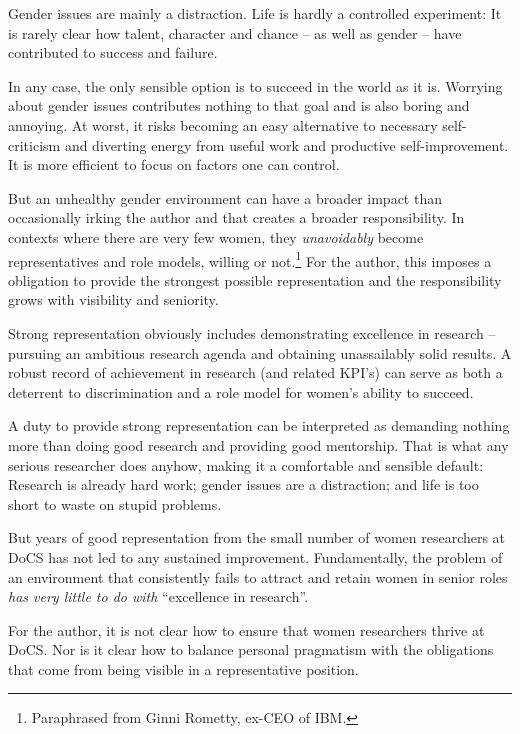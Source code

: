 \documentclass[a4paper,10pt,twocolumn]{article}
\begin{document}
Gender issues are mainly a distraction.  Life is hardly a controlled
experiment: It is rarely clear how talent, character and chance -- as
well as gender -- have contributed to success and failure.

In any case, the only sensible option is to succeed in the world as it
is.  Worrying about gender issues contributes nothing to that goal and
is also boring and annoying.  At worst, it risks becoming an easy
alternative to necessary self-criticism and diverting energy from
useful work and productive self-improvement.  It is more efficient to
focus on factors one can control.

But an unhealthy gender environment can have a broader impact than
occasionally irking the author and that creates a broader
responsibility.  In contexts where there are very few women, they
\emph{unavoidably} become representatives and role models, willing or
not.\footnote{Paraphrased from Ginni Rometty, ex-CEO of IBM.}  For the
author, this imposes a obligation to provide the strongest possible
representation and the responsibility grows with visibility and
seniority.

Strong representation obviously includes demonstrating excellence in
research -- pursuing an ambitious research agenda and obtaining
unassailably solid results.  A robust record of achievement in
research (and related KPI's) can serve as both a deterrent to
discrimination and a role model for women's ability to succeed.


A duty to provide strong representation can be interpreted as
demanding nothing more than doing good research and providing good
mentorship.  That is what any serious researcher does anyhow, making
it a comfortable and sensible default: Research is already hard work;
gender issues are a distraction; and life is too short to waste on
stupid problems.

But years of good representation from the small number of women
researchers at DoCS has not led to any sustained improvement.
Fundamentally, the problem of an environment that consistently fails
to attract and retain women in senior roles \emph{has very little to
do with} ``excellence in research''.  

For the author, it is not clear how to ensure that women researchers
thrive at DoCS.  Nor is it clear how to balance personal pragmatism
with the obligations that come from being visible in a representative
position.  
\end{document}
